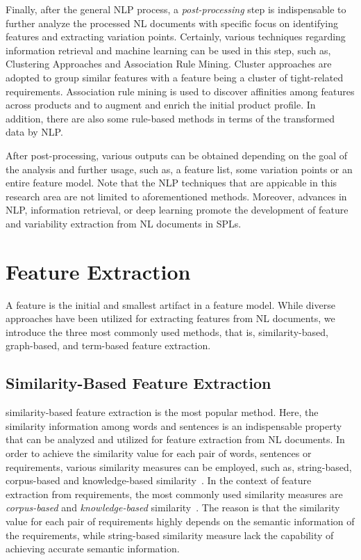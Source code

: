 \documentclass[graybox]{svmult}
\begin{document}
Finally, after the  general NLP process, a \textit{post-processing} step is indispensable to further analyze the processed NL documents with specific focus on identifying features and extracting variation points. Certainly, various techniques regarding information retrieval and machine learning can be used in this step, such as, Clustering Approaches and Association Rule Mining. Cluster approaches are adopted to group similar features with a feature being a cluster of tight-related requirements. Association rule mining is used to discover affinities among features across products and to augment and enrich the initial product profile. In addition, there are also some rule-based methods in terms of the transformed data by NLP. 

After post-processing, various outputs can be obtained depending on the goal of the analysis and further usage, such as, a feature list, some variation points or an entire feature model. 
Note that the NLP techniques that are appicable in this research area are not limited to aforementioned methods. Moreover, advances in NLP, information retrieval, or deep learning promote the development of feature and variability extraction from NL documents in SPLs.

\section{Feature Extraction}
\label{sec:feature}


A feature is the initial and smallest artifact in a feature model. While diverse approaches have been utilized for extracting features from NL documents, we introduce the three most commonly used methods, that is, similarity-based, graph-based, and term-based feature extraction.

\subsection{Similarity-Based Feature Extraction}

similarity-based feature extraction is the most popular method.
Here, the similarity information among words and sentences is an indispensable property that can be analyzed and utilized for feature extraction from NL documents.
In order to achieve the similarity value for each pair of words, sentences or requirements, various similarity measures can be employed, such as, string-based, corpus-based and knowledge-based similarity~\cite{GomaaFA13}. In the context of feature extraction from requirements, the most commonly used similarity measures are \textit{corpus-based} and \textit{knowledge-based} similarity~\cite{LiSS17}. The reason is that the similarity value for each pair of requirements highly depends on the semantic information of the requirements, while string-based similarity measure lack the capability of achieving accurate semantic information.
\end{document}
